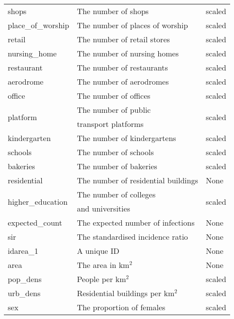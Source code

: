\begin{table}[H]
\begin{tabular}{l l l}
shops & The number of shops & scaled \\
place\_of\_worship & The number of places of worship & scaled \\
retail & The number of retail stores & scaled \\
nursing\_home & The number of nursing homes & scaled \\
restaurant & The number of restaurants & scaled \\
aerodrome & The number of aerodromes & scaled \\
office & The number of offices & scaled \\
\multirow{2}{*}{platform} & The number of public & \multirow{2}{*}{scaled} \\
& transport platforms \\
kindergarten & The number of kindergartens & scaled \\
schools & The number of schools & scaled \\
bakeries & The number of bakeries & scaled \\
residential & The number of residential buildings & None \\
\multirow{2}{*}{higher\_education} & The number of colleges & \multirow{2}{*}{scaled} \\
& and universities \\
expected\_count & The expected number of infections & None \\
sir & The standardised incidence ratio & None \\
idarea\_1 & A unique ID & None \\
area & The area in km$^2$ & None \\
pop\_dens & People per km$^2$ & scaled  \\
\multirow{1}{*}{urb\_dens} & Residential buildings per km$^2$  & scaled\\
sex & The proportion of females & scaled \\
\bottomrule
\end{tabular}
\end{table}
